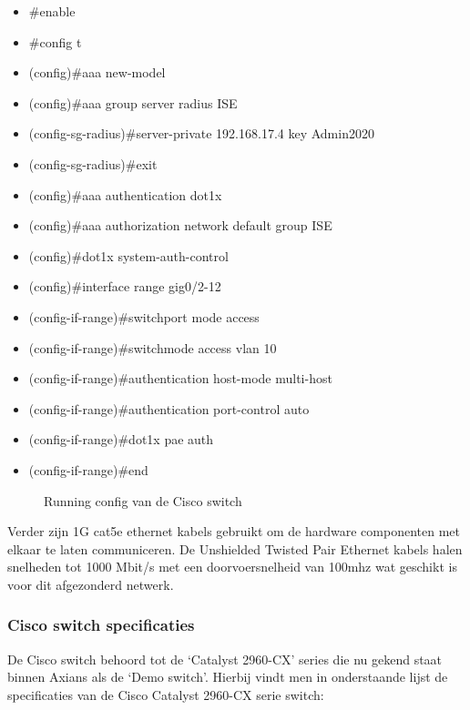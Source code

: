 \begin{itemize}
	\item \#enable
	\item \#config t
	\item (config)\#aaa new-model
	\item (config)\#aaa group server radius ISE
	\item (config-sg-radius)\#server-private 192.168.17.4 key Admin2020
	\item (config-sg-radius)\#exit
	\item (config)\#aaa authentication dot1x
	\item (config)\#aaa authorization network default group ISE
	\item (config)\#dot1x system-auth-control
	\item (config)\#interface range gig0/2-12
	\item (config-if-range)\#switchport mode access
	\item (config-if-range)\#switchmode access vlan 10
	\item (config-if-range)\#authentication host-mode multi-host
	\item (config-if-range)\#authentication port-control auto
	\item (config-if-range)\#dot1x pae auth
	\item (config-if-range)\#end
\end{itemize}

\begin{figure}[H]
	\centering
	\qquad
	\qquad
	\caption{Running config van de Cisco switch}%
	\label{fig:RunningConfig}%
\end{figure}
Verder zijn 1G cat5e ethernet kabels gebruikt om de hardware componenten met elkaar te laten communiceren. De Unshielded Twisted Pair Ethernet kabels halen snelheden tot 1000 Mbit/s met een doorvoersnelheid van 100mhz wat geschikt is voor dit afgezonderd netwerk.

\subsubsection{Cisco switch specificaties}
De Cisco switch behoord tot de ‘Catalyst 2960-CX’ series die nu gekend staat binnen Axians als de ‘Demo switch’. Hierbij vindt men in onderstaande lijst de specificaties van de Cisco Catalyst 2960-CX serie switch:

